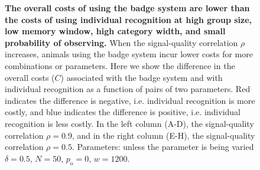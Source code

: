 \begin{figure}
\caption{\sffamily\small\textbf{The overall costs of using the badge system are lower than the costs of using individual recognition at high group size, low memory window, high category width, and small probability of observing.} When the signal-quality correlation $\rho$ increases, animals using the badge system incur lower costs for more combinations or parameters. Here we show the difference in the overall costs ($C$) associated with the badge system and with individual recognition as a function of pairs of two parameters. Red indicates the difference is negative, i.e. individual recognition is more costly, and blue indicates the difference is positive, i.e. individual recognition is less costly.  In the left column (A-D), the signal-quality correlation $\rho=0.9$, and in the right column (E-H), the signal-quality correlation $\rho=0.5$. Parameters: unless the parameter is being varied $\delta = 0.5$, $N=50$, $p_\text{o}=0$, $w=1200$.}
\label{comparison}
\end{figure}

